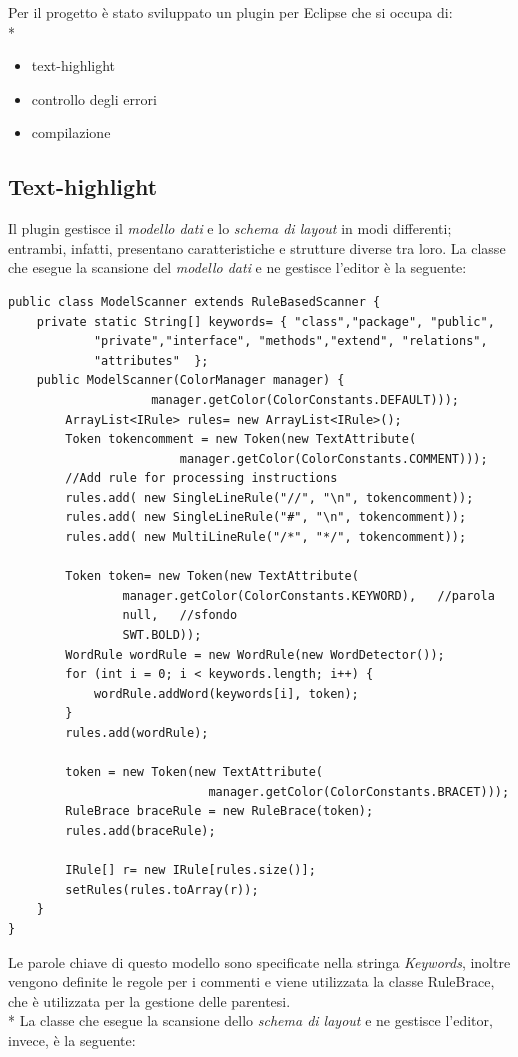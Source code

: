 Per il progetto è stato sviluppato un plugin per Eclipse che si occupa di: \\*
\begin{itemize}
  \item text-highlight
  \item controllo degli errori
  \item compilazione
\end{itemize} 


\subsection{Text-highlight}
Il plugin gestisce il \emph{modello dati} e lo \emph{schema di layout} in modi differenti; 
entrambi, infatti, presentano caratteristiche e strutture diverse tra loro.
La classe che esegue la scansione del \emph{modello dati} e ne gestisce l'editor
è la seguente:

\begin{lstlisting}[caption={ModelScanner}, style={java}]
public class ModelScanner extends RuleBasedScanner {
	private static String[] keywords= { "class","package", "public",
			"private","interface", "methods","extend", "relations", 
			"attributes"  };
	public ModelScanner(ColorManager manager) {
					manager.getColor(ColorConstants.DEFAULT)));
		ArrayList<IRule> rules= new ArrayList<IRule>();	
		Token tokencomment = new Token(new TextAttribute(
						manager.getColor(ColorConstants.COMMENT)));
		//Add rule for processing instructions
		rules.add( new SingleLineRule("//", "\n", tokencomment));
		rules.add( new SingleLineRule("#", "\n", tokencomment));
		rules.add( new MultiLineRule("/*", "*/", tokencomment));
		
		Token token= new Token(new TextAttribute(
				manager.getColor(ColorConstants.KEYWORD), 	//parola
				null, 	//sfondo
				SWT.BOLD));
		WordRule wordRule = new WordRule(new WordDetector());
		for (int i = 0; i < keywords.length; i++) {
			wordRule.addWord(keywords[i], token);
		}		
		rules.add(wordRule);
		
		token = new Token(new TextAttribute(
							manager.getColor(ColorConstants.BRACET)));
		RuleBrace braceRule = new RuleBrace(token);
		rules.add(braceRule);
		
		IRule[] r= new IRule[rules.size()];
		setRules(rules.toArray(r));
	}
}
\end{lstlisting}


Le parole chiave di questo modello sono specificate nella stringa
\emph{Keywords}, inoltre vengono definite le regole per i commenti e viene
utilizzata la classe RuleBrace, che è utilizzata per la gestione delle
parentesi.\\* 
La classe che esegue la scansione dello  \emph{schema di layout} e ne gestisce
l'editor, invece, è la seguente:

